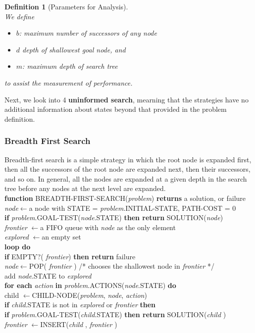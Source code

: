 \documentclass[12pt]{article}
\newcommand{\ind}{\hspace*{15pt}}
\newtheorem{definition}{Definition}[section]
\theoremstyle{definition}
\begin{document}
\begin{definition}[Parameters for Analysis]
\hfill\\\normalfont We define
\begin{itemize}
	\item $b$: maximum number of successors of any node
	\item $d$ depth of shallowest goal node, and
	\item $m$: maximum depth of search tree
\end{itemize}
to assist the measurement of performance.
\end{definition}
Next, we look into 4 \textbf{uninformed search}, mearning that the strategies have no additional information about states beyond that provided in the problem definition.
\subsubsection{Breadth First Search}
Breadth-first search is a simple strategy in which the root node is expanded first, then all the successors of the root node are expanded next, then their successors, and so on. In general, all the nodes are expanded at a given depth in the search tree before any nodes at the next level are expanded.\\
\textbf{function} \textsc{BREADTH-FIRST-SEARCH}(\textit{problem}) \textbf{returns} a solution, or failure\\
\ind \textit{node}$\leftarrow$a node with \textsc{STATE} = \textit{problem}.\textsc{INITIAL-STATE}, \textsc{PATH-COST} = 0\\
\ind \textbf{if} \textit{problem}.\textsc{GOAL-TEST}(\textit{node}.\textsc{STATE}) \textbf{then return} \textsc{SOLUTION}(\textit{node})\\
\ind \textit{frontier} $\leftarrow$a FIFO queue with \textit{node} as the only element\\
\ind \textit{explored} $\leftarrow$an empty set\\
\ind \textbf{loop do}\\
\ind \ind \textbf{if} EMPTY?( \textit{frontier}) \textbf{then return} failure\\
\ind \ind \textit{node}$\leftarrow$POP( \textit{frontier} ) /* chooses the shallowest node in \textit{frontier} */\\
\ind \ind add \textit{node}.\textsc{STATE} to \textit{explored}\\
\ind \ind \textbf{for each} \textit{action} \textbf{in} \textit{problem}.\textsc{ACTIONS}(\textit{node}.\textsc{STATE}) \textbf{do}\\
\ind \ind \ind child $\leftarrow$\textsc{CHILD-NODE}(\textit{problem}, \textit{node}, \textit{action})\\
\ind \ind \ind \textbf{if} \textit{child}.\textsc{STATE} is not in \textit{explored} or \textit{frontier} \textbf{then}\\
\ind \ind \ind \ind \textbf{if} \textit{problem}.\textsc{GOAL-TEST}(\textit{child}.\textsc{STATE}) \textbf{then return} \textsc{SOLUTION}(\textit{child} )\\
\ind\ind\ind\ind\textit{frontier} $\leftarrow$\textsc{INSERT}(\textit{child} , \textit{frontier} )\\
\end{document}
